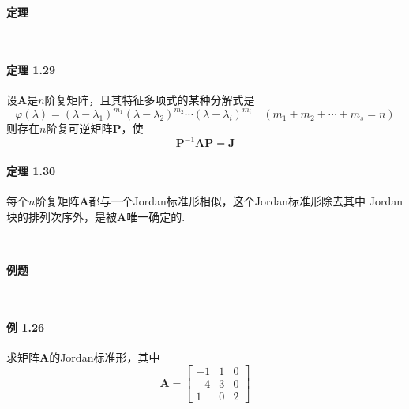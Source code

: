 \documentclass[12pt, a4paper, oneside, fontset=none]{ctexart}
\begin{document}
\centerline{\large{\textbf{定理}}} \ \par

\paragraph*{定理 1.29} 设$\bm{A}$是$n$阶复矩阵，且其特征多项式的某种分解式是
\[
    \varphi(\lambda) = (\lambda - \lambda_1)^{m_1}(\lambda - \lambda_2)^{m_2}\cdots(\lambda - \lambda_i)^{m_i} \quad (m_1 + m_2 + \cdots + m_s = n)
\]
则存在$n$阶复可逆矩阵$\bm{P}$，使
\[
    \bm{P}^{-1}\bm{AP} = \bm{J}
\]

\paragraph*{定理 1.30} 每个$n$阶复矩阵$\bm{A}$都与一个Jordan标准形相似，这个Jordan标准形除去其中
Jordan块的排列次序外，是被$\bm{A}$唯一确定的.

\par \ \par

\centerline{\large{\textbf{例题}}} \ \par

\paragraph*{例 1.26} 求矩阵$\bm{A}$的Jordan标准形，其中
\[
    \bm{A} = \begin{bmatrix}
        -1 & 1 & 0 \\
        -4 & 3 & 0 \\
        1  & 0 & 2
    \end{bmatrix}
\]
\end{document}
